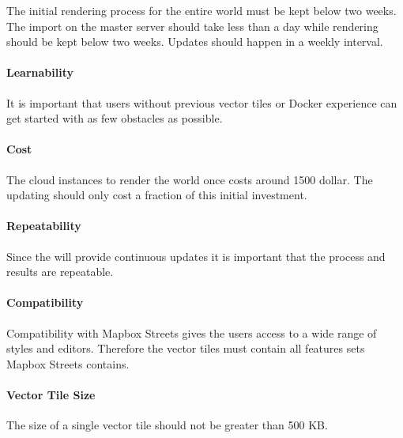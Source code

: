 The initial rendering process for the entire world must be kept below two weeks. The import on the master server should take less than a day while rendering should be kept below two weeks.
Updates should happen in a weekly interval.

\paragraph{Learnability}

It is important that users without previous vector tiles or Docker experience can get started with as few obstacles as possible.

\paragraph{Cost}

The cloud instances to render the world once costs around 1500 dollar. The updating should only cost a fraction of this initial investment.

\paragraph{Repeatability}

Since the \osmvt{} will provide continuous updates it is important that the process and results are repeatable.

\paragraph{Compatibility}

Compatibility with Mapbox Streets gives the users access
to a wide range of styles and editors. Therefore the vector tiles must contain
all features sets Mapbox Streets contains.

\paragraph{Vector Tile Size}

The size of a single vector tile should not be greater than 500 KB.
